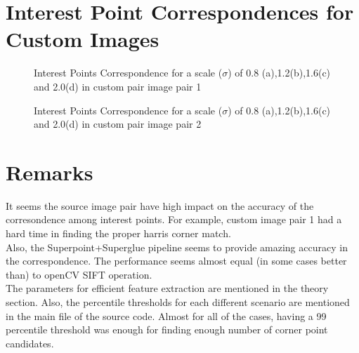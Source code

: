 \documentclass{article}
\begin{document}
\section{Interest Point Correspondences for Custom Images}
\begin{figure}[!htbp]
     \centering
    \captionsetup[subfigure]{labelformat=empty}
    \caption{Interest Points Correspondence for a scale ($\sigma$) of 0.8 (a),1.2(b),1.6(c) and 2.0(d) in custom pair image pair 1}
\end{figure}

\begin{figure}[!htbp]
     \centering
    \captionsetup[subfigure]{labelformat=empty}
    \caption{Interest Points Correspondence for a scale ($\sigma$) of 0.8 (a),1.2(b),1.6(c) and 2.0(d) in custom pair image pair 2}
\end{figure}

\section{Remarks}
It seems the source image pair have high impact on the accuracy of the corresondence among interest points. For example, custom  image pair 1 had a hard time in finding the proper harris corner match.\\
Also, the Superpoint+Superglue pipeline seems to provide amazing accuracy in the correspondence. The performance seems almost equal (in some cases better than) to openCV SIFT operation.\\
The parameters for efficient feature extraction are mentioned in the theory section. Also, the percentile thresholds for each different scenario are mentioned in the main file of the source code. Almost for all of the cases, having a 99 percentile threshold was enough for finding enough number of corner point candidates.
\newpage
\end{document}
